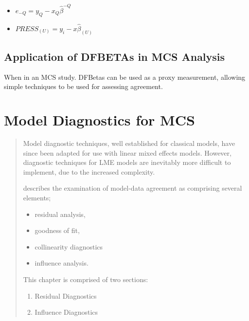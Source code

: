 \documentclass[Main.tex]{subfiles}
\begin{document}
	
	\begin{itemize}
		\item $e_{-Q} = y_{Q} - x_{Q}\hat{\beta}^{-Q}$
		\item $PRESS_{(U)} = y_{i} - x\hat{\beta}_{(U)}$
	\end{itemize}
	



\section{Application of DFBETAs in MCS Analysis}


When in an MCS study. DFBetas can be used as a proxy measurement, allowing simple techniques to be used for assessing agreement.



\chapter{Model Diagnostics for MCS}

\begin{abstract}
Model diagnostic techniques, well established for classical models, have since been adapted for use with linear mixed effects models. However, diagnostic techniques for LME models are inevitably more difficult to implement, due to the increased complexity. \\ \bigskip


\citet{schab} describes the examination of model-data agreement as comprising several elements; \begin{itemize}
		\item residual analysis, 
		\item goodness of fit, 
		\item collinearity diagnostics
		\item influence analysis.
	\end{itemize} 
	
This chapter is comprised of two sections:
\begin{enumerate}
	\item Residual Diagnostics
	\item Influence Diagnostics
\end{enumerate}
\end{abstract}

\newpage
\end{document}

